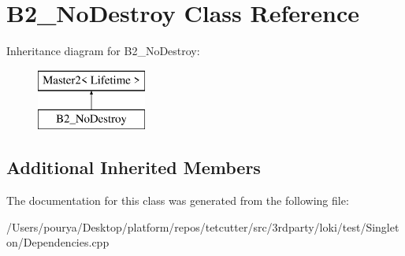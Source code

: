 \hypertarget{classB2__NoDestroy}{}\section{B2\+\_\+\+No\+Destroy Class Reference}
\label{classB2__NoDestroy}
Inheritance diagram for B2\+\_\+\+No\+Destroy\+:\begin{figure}[H]
\begin{center}
\leavevmode
\includegraphics[height=2.000000cm]{classB2__NoDestroy}
\end{center}
\end{figure}
\subsection*{Additional Inherited Members}


The documentation for this class was generated from the following file\+:\begin{DoxyCompactItemize}
\item 
/\+Users/pourya/\+Desktop/platform/repos/tetcutter/src/3rdparty/loki/test/\+Singleton/Dependencies.\+cpp\end{DoxyCompactItemize}
